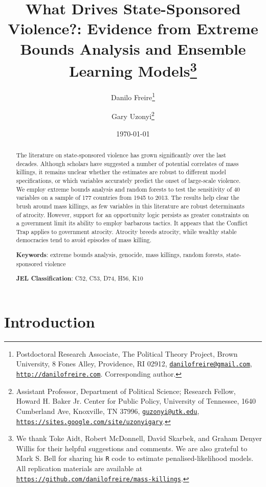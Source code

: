 \documentclass[a4paper,12pt]{article}
\title{What Drives State-Sponsored Violence?: Evidence from Extreme Bounds Analysis and Ensemble Learning Models\thanks{We thank Toke Aidt, Robert McDonnell, David Skarbek, and Graham Denyer Willis for their helpful suggestions and comments. We are also grateful to Mark S. Bell for sharing his \texttt{R} code to estimate penalised-likelihood models. All replication materials are available at \href{https://github.com/danilofreire/mass-killings}{\texttt{https://github.com/danilofreire/mass-killings}}.}}
\author{Danilo Freire\thanks{Postdoctoral Research Associate, The Political Theory Project, Brown University, 8 Fones Alley, Providence, RI 02912,  \href{mailto:danilofreire@gmail.com}{\texttt{danilofreire@gmail.com}},  \href{http://danilofreire.com}{\texttt{http://danilofreire.com}}. Corresponding author.} \and Gary Uzonyi\thanks{Assistant Professor, Department of Political Science; Research Fellow, Howard H. Baker Jr. Center for Public Policy, University of Tennessee, 1640 Cumberland Ave, Knoxville, TN 37996, \href{mailto:guzonyi@utk.edu}{\texttt{guzonyi@utk.edu}}, \href{https://sites.google.com/site/uzonyigary/}{\texttt{https://sites.google.com/site/uzonyigary}}.}}
\date{\today}
\begin{document}
\maketitle
	
\begin{abstract}
 \noindent
The literature on state-sponsored violence has grown significantly over the last decades. Although scholars have suggested a number of potential correlates of mass killings, it remains unclear whether the estimates are robust to different model specifications, or which variables accurately predict the onset of large-scale violence. We employ extreme bounds analysis and random forests to test the sensitivity of 40 variables on a sample of 177 countries from 1945 to 2013. The results help clear the brush around mass killings, as few variables in this literature are robust determinants of atrocity. However, support for an opportunity logic persists as greater constraints on a government limit its ability to employ barbarous tactics. It appears that the Conflict Trap applies to government atrocity. Atrocity breeds atrocity, while wealthy stable democracies tend to avoid episodes of mass killing.
	
 \vspace{.75cm}
 \noindent
 \textbf{Keywords}: extreme bounds analysis, genocide, mass killings, random forests, state-sponsored violence
	
 \vspace{.25cm}
 \noindent
 \textbf{JEL Classification}: C52, C53, D74, H56, K10
\end{abstract}
	
\newpage
	
\section{Introduction}
\label{sec:intro}
	
\doublespacing
	
\end{document}
